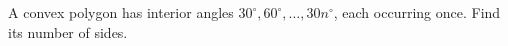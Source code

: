 A convex polygon has interior angles $ 30^\circ,60^\circ,\ldots,30n^\circ $, each occurring once. Find its number of sides.
